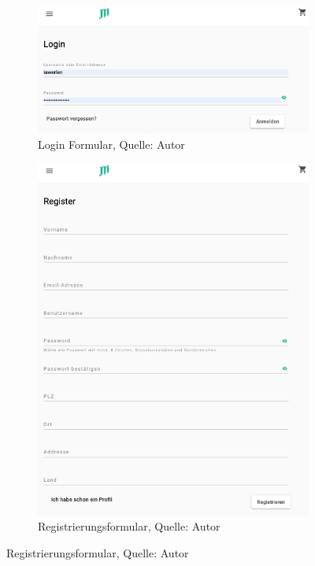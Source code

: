 \begin{figure}[H]
 	\begin{subfigure}[b]{0.4\textwidth}
 		\includegraphics[scale=0.4]{images/loginForm.PNG}
 		\caption[Login Formular]{Login Formular, Quelle: Autor}
 		\label{img: loginForm}
 	\end{subfigure}
 	\hfill
 	\begin{subfigure}[b]{0.4\textwidth}
 		\includegraphics[scale=0.3]{images/registerForm.PNG}
 		\caption[Registrierungsformular]{Registrierungsformular, Quelle: Autor}
 		\label{img: registerForm}
 	\end{subfigure}
\end{figure} 
 
